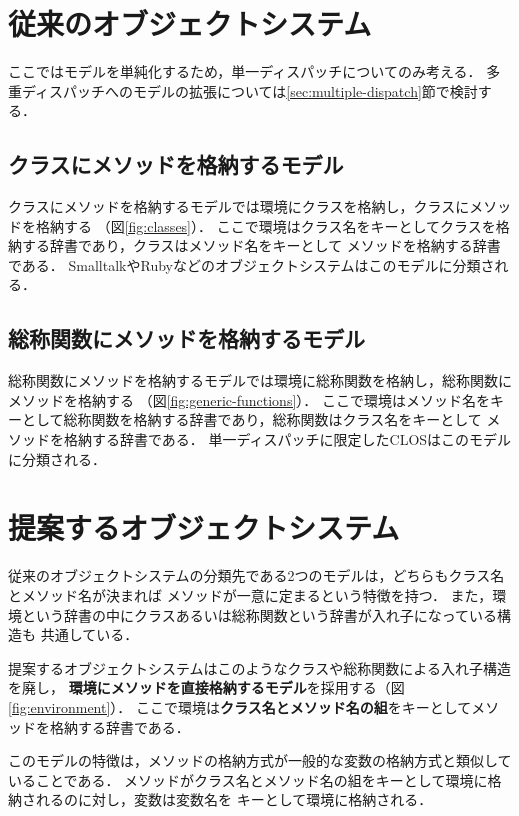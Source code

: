 \documentclass{ipsjprosym}
\begin{document}
\section{従来のオブジェクトシステム}

ここではモデルを単純化するため，単一ディスパッチについてのみ考える．
多重ディスパッチへのモデルの拡張については\ref{sec:multiple-dispatch}節で検討する．

\subsection{クラスにメソッドを格納するモデル}

クラスにメソッドを格納するモデルでは環境にクラスを格納し，クラスにメソッドを格納する
（図\ref{fig:classes}）．
ここで環境はクラス名をキーとしてクラスを格納する辞書であり，クラスはメソッド名をキーとして
メソッドを格納する辞書である．
SmalltalkやRubyなどのオブジェクトシステムはこのモデルに分類される．

\subsection{総称関数にメソッドを格納するモデル}
\label{sec:generic-finctions}

総称関数にメソッドを格納するモデルでは環境に総称関数を格納し，総称関数にメソッドを格納する
（図\ref{fig:generic-functions}）．
ここで環境はメソッド名をキーとして総称関数を格納する辞書であり，総称関数はクラス名をキーとして
メソッドを格納する辞書である．
単一ディスパッチに限定したCLOSはこのモデルに分類される．

\section{提案するオブジェクトシステム}
\label{sec:proposal}

従来のオブジェクトシステムの分類先である2つのモデルは，どちらもクラス名とメソッド名が決まれば
メソッドが一意に定まるという特徴を持つ．
また，環境という辞書の中にクラスあるいは総称関数という辞書が入れ子になっている構造も
共通している．

提案するオブジェクトシステムはこのようなクラスや総称関数による入れ子構造を廃し，
\textbf{環境にメソッドを直接格納するモデル}を採用する（図\ref{fig:environment}）．
ここで環境は\textbf{クラス名とメソッド名の組}をキーとしてメソッドを格納する辞書である．

このモデルの特徴は，メソッドの格納方式が一般的な変数の格納方式と類似していることである．
メソッドがクラス名とメソッド名の組をキーとして環境に格納されるのに対し，変数は変数名を
キーとして環境に格納される．
\end{document}
